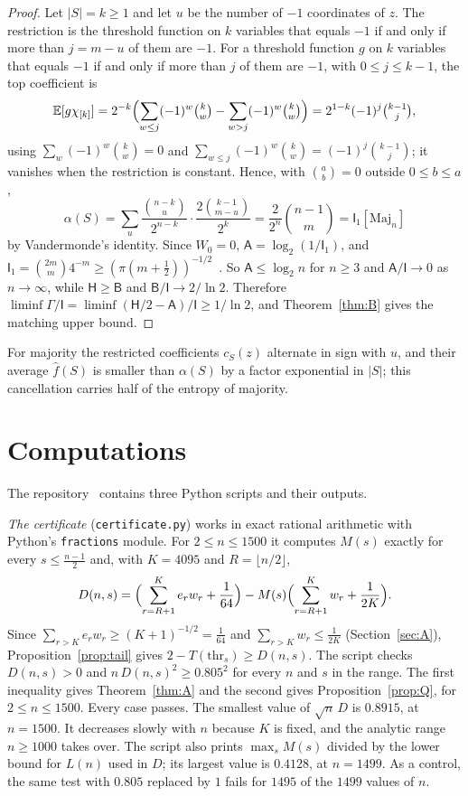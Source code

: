 \documentclass[11pt]{amsart}
\theoremstyle{remark}
\newcommand{\E}{\mathbb E}
\newcommand{\HH}{\mathsf H}
\newcommand{\I}{\mathsf I}
\newcommand{\wh}[1]{\widehat{#1}}
\newcommand{\thr}{\mathrm{thr}}
\begin{document}
\begin{proof}
Let $|S|=k\ge1$ and let $u$ be the number of $-1$ coordinates of $z$. The restriction is the threshold function on $k$ variables that equals $-1$ if and only if more than $j=m-u$ of them are $-1$. For a threshold function $g$ on $k$ variables that equals $-1$ if and only if more than $j$ of them are $-1$, with $0\le j\le k-1$, the top coefficient is
\[
 \E[g\chi_{[k]}]=2^{-k}\Bigl(\sum_{w\le j}(-1)^w\tbinom kw-\sum_{w>j}(-1)^w\tbinom kw\Bigr)=2^{1-k}(-1)^j\tbinom{k-1}{j},
\]
using $\sum_w(-1)^w\binom kw=0$ and $\sum_{w\le j}(-1)^w\binom kw=(-1)^j\binom{k-1}j$; it vanishes when the restriction is constant. Hence, with $\binom ab=0$ outside $0\le b\le a$,
\[
 \alpha(S)=\sum_{u}\frac{\binom{n-k}u}{2^{n-k}}\cdot\frac{2\binom{k-1}{m-u}}{2^k}=\frac{2}{2^n}\binom{n-1}{m}=\I_1[\mathrm{Maj}_n]
\]
by Vandermonde's identity. Since $W_0=0$, $\mathsf A=\log_2(1/\I_1)$, and $\I_1=\binom{2m}m4^{-m}\ge(\pi(m+\frac12))^{-1/2}$~\cite{Kaz56}. So $\mathsf A\le\log_2n$ for $n\ge3$ and $\mathsf A/\I\to0$ as $n\to\infty$, while $\HH\ge\mathsf B$ and $\mathsf B/\I\to2/\ln2$. Therefore $\liminf\Gamma/\I=\liminf(\HH/2-\mathsf A)/\I\ge1/\ln2$, and Theorem~\ref{thm:B} gives the matching upper bound.
\end{proof}

For majority the restricted coefficients $c_S(z)$ alternate in sign with $u$, and their average $\wh f(S)$ is smaller than $\alpha(S)$ by a factor exponential in $|S|$; this cancellation carries half of the entropy of majority.

\section{Computations}\label{sec:computations}

The repository~\cite{Repo} contains three Python scripts and their outputs.

\emph{The certificate} (\texttt{certificate.py}) works in exact rational arithmetic with Python's \texttt{fractions} module. For $2\le n\le1500$ it computes $M(s)$ exactly for every $s\le\frac{n-1}2$ and, with $K=4095$ and $R=\lfloor n/2\rfloor$,
\[
 D(n,s)=\Bigl(\sum_{r=R+1}^Ke_rw_r+\frac1{64}\Bigr)-M(s)\Bigl(\sum_{r=R+1}^Kw_r+\frac1{2K}\Bigr).
\]
Since $\sum_{r>K}e_rw_r\ge(K+1)^{-1/2}=\frac1{64}$ and $\sum_{r>K}w_r\le\frac1{2K}$ (Section~\ref{sec:A}), Proposition~\ref{prop:tail} gives $2-T(\thr_s)\ge D(n,s)$. The script checks $D(n,s)>0$ and $n\,D(n,s)^2\ge0.805^2$ for every $n$ and $s$ in the range. The first inequality gives Theorem~\ref{thm:A} and the second gives Proposition~\ref{prop:Q}, for $2\le n\le1500$. Every case passes. The smallest value of $\sqrt n\,D$ is $0.8915$, at $n=1500$. It decreases slowly with $n$ because $K$ is fixed, and the analytic range $n\ge1000$ takes over. The script also prints $\max_sM(s)$ divided by the lower bound for $L(n)$ used in $D$; its largest value is $0.4128$, at $n=1499$. As a control, the same test with $0.805$ replaced by $1$ fails for $1495$ of the $1499$ values of $n$.
\end{document}
